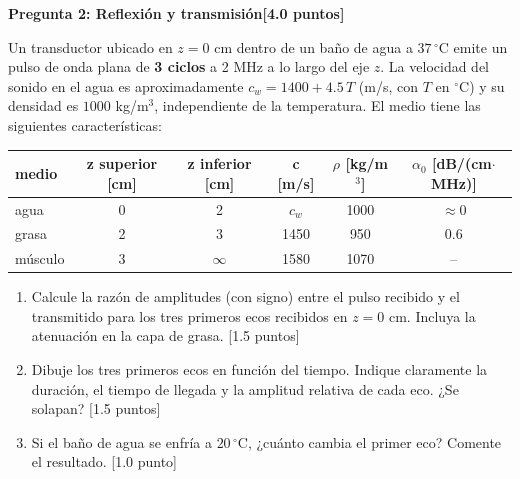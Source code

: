 \documentclass[11pt,a4paper]{article}
\newcommand{\question}[2]{\vspace{6pt}\textbf{#1}\hfill\textbf{[#2]}\par}
\newcommand{\pts}[1]{\hfill[#1]}
\begin{document}
\question{Pregunta 2: Reflexión y transmisión}{4.0 puntos}
Un transductor ubicado en $z = 0$ cm dentro de un baño de agua a $37\,^\circ$C emite un pulso de onda plana de \textbf{3 ciclos} a 2 MHz a lo largo del eje $z$. La velocidad del sonido en el agua es aproximadamente $c_w = 1400 + 4.5\,T$ (m/s, con $T$ en $^\circ$C) y su densidad es $1000$ kg/m$^3$, independiente de la temperatura. El medio tiene las siguientes características:
\begin{center}
\begin{tabular}{l|c|c|c|c|c}
medio & z superior [cm] & z inferior [cm] & c [m/s] & $\rho$ [kg/m$^3$] & $\alpha_0$ [dB/(cm$\cdot$MHz)]\\\hline
agua & 0 & 2 & $c_w$ & 1000 & $\approx 0$\\
grasa & 2 & 3 & 1450 & 950 & 0.6\\
músculo & 3 & $\infty$ & 1580 & 1070 & --
\end{tabular}
\end{center}
\begin{enumerate}
\item Calcule la razón de amplitudes (con signo) entre el pulso recibido y el transmitido para los tres primeros ecos recibidos en $z = 0$ cm. Incluya la atenuación en la capa de grasa. \pts{1.5 puntos}
\item Dibuje los tres primeros ecos en función del tiempo. Indique claramente la duración, el tiempo de llegada y la amplitud relativa de cada eco. ¿Se solapan? \pts{1.5 puntos}
\item Si el baño de agua se enfría a $20\,^\circ$C, ¿cuánto cambia el primer eco? Comente el resultado. \pts{1.0 punto}
\end{enumerate}
\end{document}
